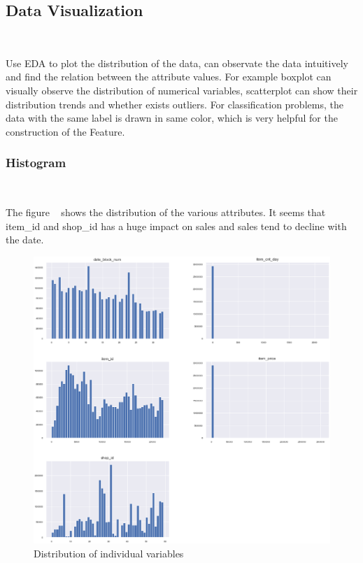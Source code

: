 \subsection{Data Visualization}
\

Use EDA to plot the distribution of the data,
can observate the data intuitively and
find the relation between the attribute values. 
For example boxplot can visually observe 
the distribution of numerical variables, 
scatterplot can show their distribution trends 
and whether exists outliers.
For classification problems, 
the data with the same label is drawn in same color, 
which is very helpful for 
the construction of the Feature.


\subsubsection{ Histogram}
\

The figure ~ 
shows the distribution of the various attributes. It seems that item\_id and 
shop\_id has a huge impact on sales and sales tend to decline with the date.


\begin{figure}[htbp]
	\centering
	
	\includegraphics[scale=0.3]{figures/his_1.eps}
	\caption{Distribution of individual variables}\label{fig:his_1}
\end{figure}


